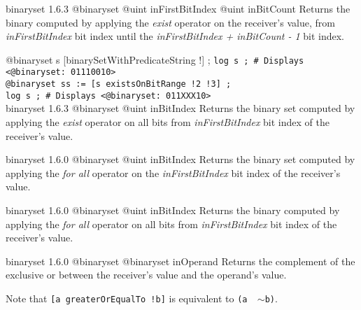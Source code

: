 {binaryset}
{1.6.3}
{@binaryset}
{@uint inFirstBitIndex}
{@uint inBitCount}
{Returns the binary computed by applying the \emph{exist} operator on the receiver's value, from \emph{inFirstBitIndex} bit index until the \emph{inFirstBitIndex + inBitCount - 1} bit index.}
{}


\exempleUneLigne
{}
{@binaryset s [binarySetWithPredicateString !\textquotedbl] ;}
\texttt{log s ; \# Displays <@binaryset:~01110010>}\\
\texttt{@binaryset ss := [s existsOnBitRange !2 !3] ;}\\
\texttt{log s ; \# Displays <@binaryset:~011XXX10>}\\







{binaryset}
{1.6.3}
{@binaryset}
{@uint inBitIndex}
{Returns the binary set computed by applying the \emph{exist} operator on all bits from \emph{inFirstBitIndex} bit index of the receiver's value.}
{}







{binaryset}
{1.6.0}
{@binaryset}
{@uint inBitIndex}
{Returns the binary set computed by applying the \emph{for all} operator on the \emph{inFirstBitIndex} bit index of the receiver's value.}
{}







{binaryset}
{1.6.0}
{@binaryset}
{@uint inBitIndex}
{Returns the binary computed by applying the \emph{for all} operator on all bits from \emph{inFirstBitIndex} bit index of the receiver's value.}
{}








{binaryset}
{1.6.0}
{@binaryset}
{@binaryset inOperand}
{Returns the complement of the exclusive or between the receiver's value and the operand's value.}
{}

Note that \texttt{[a greaterOrEqualTo !b]} is equivalent to \texttt{(a \textbar ~$\sim$b)}.








